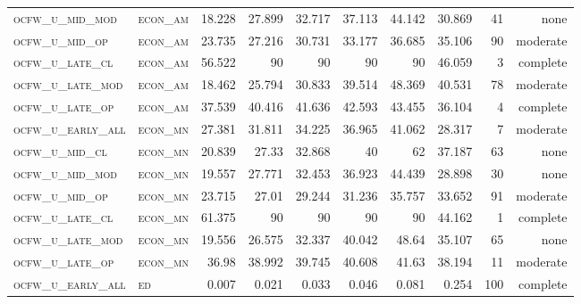 \begin{landscape}
\begin{center}
\begin{footnotesize}
\begin{longtable}{llrrrrr|rrr}
\textsc{ocfw\_u\_mid\_mod  } & \textsc{econ\_am  }    & 18.228   & 27.899   & 32.717   & 37.113   & 44.142    & 30.869        & 41            & none       \\
\textsc{ocfw\_u\_mid\_op   } & \textsc{econ\_am  }    & 23.735   & 27.216   & 30.731   & 33.177   & 36.685    & 35.106        & 90            & moderate       \\
\textsc{ocfw\_u\_late\_cl  } & \textsc{econ\_am  }    & 56.522   & 90       & 90       & 90       & 90        & 46.059        & 3             & complete       \\
\textsc{ocfw\_u\_late\_mod } & \textsc{econ\_am  }    & 18.462   & 25.794   & 30.833   & 39.514   & 48.369    & 40.531        & 78            & moderate       \\
\textsc{ocfw\_u\_late\_op  } & \textsc{econ\_am  }    & 37.539   & 40.416   & 41.636   & 42.593   & 43.455    & 36.104        & 4             & complete       \\
\textsc{ocfw\_u\_early\_all} & \textsc{econ\_mn  }    & 27.381   & 31.811   & 34.225   & 36.965   & 41.062    & 28.317        & 7             & moderate       \\
\textsc{ocfw\_u\_mid\_cl   } & \textsc{econ\_mn  }    & 20.839   & 27.33    & 32.868   & 40       & 62        & 37.187        & 63            & none       \\
\textsc{ocfw\_u\_mid\_mod  } & \textsc{econ\_mn  }    & 19.557   & 27.771   & 32.453   & 36.923   & 44.439    & 28.898        & 30            & none       \\
\textsc{ocfw\_u\_mid\_op   } & \textsc{econ\_mn  }    & 23.715   & 27.01    & 29.244   & 31.236   & 35.757    & 33.652        & 91            & moderate       \\
\textsc{ocfw\_u\_late\_cl  } & \textsc{econ\_mn  }    & 61.375   & 90       & 90       & 90       & 90        & 44.162        & 1             & complete       \\
\textsc{ocfw\_u\_late\_mod } & \textsc{econ\_mn  }    & 19.556   & 26.575   & 32.337   & 40.042   & 48.64     & 35.107        & 65            & none       \\
\textsc{ocfw\_u\_late\_op  } & \textsc{econ\_mn  }    & 36.98    & 38.992   & 39.745   & 40.608   & 41.63     & 38.194        & 11            & moderate       \\
\textsc{ocfw\_u\_early\_all} & \textsc{ed        }    & 0.007    & 0.021    & 0.033    & 0.046    & 0.081     & 0.254         & 100           & complete            \\

\end{longtable}
\end{footnotesize}
\end{center}
\end{landscape}
